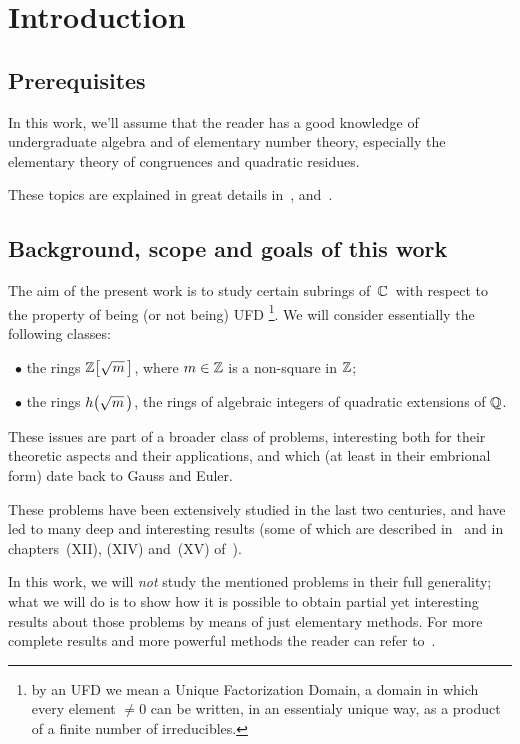 \chapter*{Introduction}

\section{Prerequisites}
In this work, we'll assume that the reader has a good knowledge of
undergraduate algebra and of elementary number theory, especially the
elementary theory of congruences and quadratic residues.

These topics are explained in great details in~\cite{H&W}, \cite{Childs}
and~\cite{Sha}.

\section{Background, scope and goals of this work}
The aim of the present work is to study certain subrings of\, $\mathbb{C}$\, with
respect to the property of being (or not being) UFD%
\footnote{%
by an UFD we mean a Unique Factorization Domain, \ie a domain in which
every element $\neq 0$ can be written, in an essentialy unique way, as
a product of a finite number of irreducibles.%
}. We will consider essentially the following classes:

\smallskip

~$\bullet$ the rings $\ZZ{m}$, where $m\in\mathbb{Z}$ is a non-square in $\mathbb{Z}$;

~$\bullet$ the rings $\hh{m}$, \ie the rings of algebraic integers of
           quadratic extensions of $\mathbb{Q}$.
\smallskip

These issues are part of a broader class of problems, interesting both
for their theoretic aspects and their applications, and which (at least in
their embrional form) date back to Gauss and Euler.

These problems have been extensively studied in the last two centuries,
and have led to many deep and interesting results (some of which are
described in~\cite{S&T} and in chapters~{\small(XII)}, {\small(XIV)}
and~{\small(XV)} of~\cite{H&W}).

In this work, we will \emph{not\/} study the mentioned problems in their
full generality; what we will do is to show how it is possible to obtain
partial yet interesting results about those problems by means of just
elementary methods. For more complete results and more powerful methods
the reader can refer to~\cite{S&T}.

